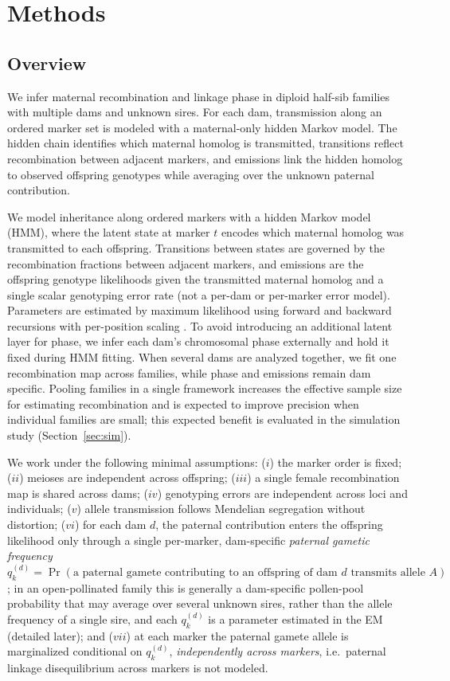 \documentclass[11pt]{article}
\begin{document}
\section{Methods}

\subsection{Overview}
We infer maternal recombination and linkage phase in diploid half-sib families with multiple dams and unknown sires. For each dam, transmission along an ordered marker set is modeled with a maternal-only hidden Markov model. The hidden chain identifies which maternal homolog is transmitted, transitions reflect recombination between adjacent markers, and emissions link the hidden homolog to observed offspring genotypes while averaging over the unknown paternal contribution.

We model inheritance along ordered markers with a hidden Markov model (HMM), where the latent state at marker $t$ encodes which maternal homolog was transmitted to each offspring. Transitions between states are governed by the recombination fractions between adjacent markers, and emissions are the offspring genotype likelihoods given the transmitted maternal homolog and a single scalar genotyping error rate (not a per-dam or per-marker error model). Parameters are estimated by maximum likelihood using forward and backward recursions with per-position scaling \citep{Rabiner1989}. To avoid introducing an additional latent layer for phase, we infer each dam’s chromosomal phase externally and hold it fixed during HMM fitting. When several dams are analyzed together, we fit one recombination map across families, while phase and emissions remain dam specific. Pooling families in a single framework increases the effective sample size for estimating recombination and is expected to improve precision when individual families are small; this expected benefit is evaluated in the simulation study (Section~\ref{sec:sim}).


We work under the following minimal assumptions: ($i$) the marker order is fixed; ($ii$) meioses are independent across offspring; ($iii$) a single female recombination map is shared across dams; ($iv$) genotyping errors are independent across loci and individuals; ($v$) allele transmission follows Mendelian segregation without distortion; ($vi$) for each dam $d$, the paternal contribution enters the offspring likelihood only through a single per-marker, dam-specific \emph{paternal gametic frequency} $q_k^{(d)}=\Pr(\text{a paternal gamete contributing to an offspring of dam }d\text{ transmits allele }A)$; in an open-pollinated family this is generally a dam-specific pollen-pool probability that may average over several unknown sires, rather than the allele frequency of a single sire, and each $q_k^{(d)}$ is a parameter estimated in the EM (detailed later); and ($vii$) at each marker the paternal gamete allele is marginalized conditional on $q_k^{(d)}$, \emph{independently across markers}, i.e.\ paternal linkage disequilibrium across markers is not modeled.
\end{document}
